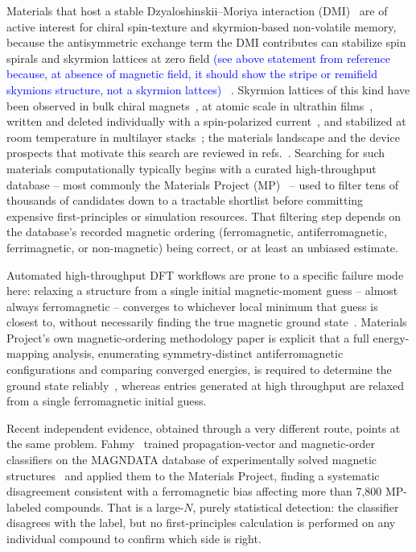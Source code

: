 \documentclass[aps,prb,preprint,superscriptaddress,longbibliography,nofootinbib]{revtex4-2}
\begin{document}
Materials that host a stable Dzyaloshinskii--Moriya interaction (DMI)~\cite{dzyaloshinsky1958,moriya1960}
are of active interest for chiral spin-texture and skyrmion-based non-volatile memory, because the
antisymmetric exchange term the DMI contributes can stabilize spin spirals and skyrmion lattices at zero field \textcolor{blue}{(see above statement from reference because, at absence of magnetic field, it should show the stripe or remifield skymions structure, not a skyrmion lattces)}
~\cite{bogdanov1994,fert2013,nagaosa2013}. Skyrmion lattices of this kind have been observed in bulk
chiral magnets~\cite{muhlbauer2009,yu2010}, at atomic scale in ultrathin films~\cite{heinze2011}, written and
deleted individually with a spin-polarized current~\cite{romming2013}, and stabilized at room temperature in
multilayer stacks~\cite{woo2016}; the materials landscape and the device prospects that motivate this search
are reviewed in refs.~\cite{fert2017,tokura2021}. Searching for such materials computationally typically begins
with a curated high-throughput database -- most commonly the Materials Project
(MP)~\cite{jain2013} -- used to filter tens of thousands of candidates down to a tractable shortlist before
committing expensive first-principles or simulation resources. That filtering step depends on the database's
recorded magnetic ordering (ferromagnetic, antiferromagnetic, ferrimagnetic, or non-magnetic) being correct,
or at least an unbiased estimate.

Automated high-throughput DFT workflows are prone to a specific failure mode here: relaxing a structure from
a single initial magnetic-moment guess -- almost always ferromagnetic -- converges to whichever local minimum
that guess is closest to, without necessarily finding the true magnetic ground state~\cite{horton2019}.
Materials Project's own magnetic-ordering methodology paper is explicit that a full energy-mapping analysis,
enumerating symmetry-distinct antiferromagnetic configurations and comparing converged energies, is required
to determine the ground state reliably~\cite{horton2019}, whereas entries generated at high throughput are
relaxed from a single ferromagnetic initial guess.

Recent independent evidence, obtained through a very different route, points at the same problem.
Fahmy~\cite{fahmy2026} trained propagation-vector and magnetic-order classifiers on the MAGNDATA database of
experimentally solved magnetic structures~\cite{gallego2016a,gallego2016b} and applied them to the Materials
Project, finding a systematic disagreement consistent with a ferromagnetic bias affecting more than
7{,}800 MP-labeled compounds. That is a large-$N$, purely statistical detection: the classifier disagrees with the
label, but no first-principles calculation is performed on any individual compound to confirm which side is
right.
\end{document}
